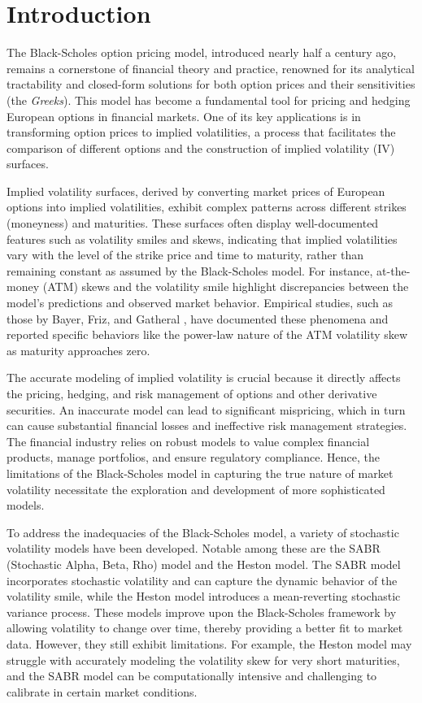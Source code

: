 \documentclass{article}
\theoremstyle{remark}
\begin{document}
\tableofcontents
\newpage

\section{Introduction}
The Black-Scholes option pricing model, introduced nearly half a century ago, remains a cornerstone of financial theory and practice,
renowned for its analytical tractability and closed-form solutions for both option prices and their sensitivities (the \emph{Greeks}).
This model has become a fundamental tool for pricing and hedging European options in financial markets.
One of its key applications is in transforming option prices to implied volatilities, a process that facilitates
the comparison of different options and the construction of implied volatility (IV) surfaces.

Implied volatility surfaces, derived by converting market prices of European options into implied volatilities,
exhibit complex patterns across different strikes (moneyness) and maturities.
These surfaces often display well-documented features such as volatility smiles and skews,
indicating that implied volatilities vary with the level of the strike price and time to maturity,
rather than remaining constant as assumed by the Black-Scholes model.
For instance, at-the-money (ATM) skews and the volatility smile highlight discrepancies between the model's predictions
and observed market behavior. Empirical studies, such as those by Bayer, Friz, and Gatheral \cite{BFG15}, have documented these phenomena
and reported specific behaviors like the power-law nature of the ATM volatility skew as maturity approaches zero.

The accurate modeling of implied volatility is crucial because it directly affects the pricing, hedging, and risk management of options
and other derivative securities.
An inaccurate model can lead to significant mispricing, which in turn can cause substantial financial losses
and ineffective risk management strategies.
The financial industry relies on robust models to value complex financial products,
manage portfolios, and ensure regulatory compliance.
Hence, the limitations of the Black-Scholes model in capturing the true nature of market volatility necessitate
the exploration and development of more sophisticated models.

To address the inadequacies of the Black-Scholes model, a variety of stochastic volatility models have been developed.
Notable among these are the SABR (Stochastic Alpha, Beta, Rho) model and the Heston model.
The SABR model incorporates stochastic volatility and can capture the dynamic behavior of the volatility smile,
while the Heston model introduces a mean-reverting stochastic variance process.
These models improve upon the Black-Scholes framework by allowing volatility to change over time,
thereby providing a better fit to market data.
However, they still exhibit limitations. For example, the Heston model may struggle with accurately modeling the volatility skew
for very short maturities, and the SABR model can be computationally intensive and challenging to calibrate in certain market conditions.
\end{document}
